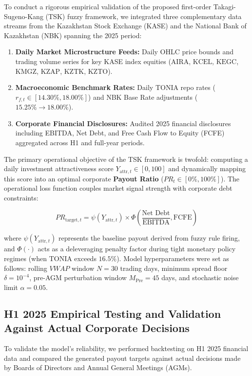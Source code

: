 \documentclass[pdflatex,sn-mathphys-num]{sn-jnl}
\theoremstyle{thmstyleone}
\theoremstyle{thmstyletwo}
\theoremstyle{thmstylethree}
\begin{document}
To conduct a rigorous empirical validation of the proposed first-order Takagi-Sugeno-Kang (TSK) fuzzy framework, we integrated three complementary data streams from the Kazakhstan Stock Exchange (KASE) and the National Bank of Kazakhstan (NBK) spanning the 2025 period:
\begin{enumerate}
    \item \textbf{Daily Market Microstructure Feeds:} Daily OHLC price bounds and trading volume series for key KASE index equities ($\text{AIRA}$, $\text{KCEL}$, $\text{KEGC}$, $\text{KMGZ}$, $\text{KZAP}$, $\text{KZTK}$, $\text{KZTO}$).
    \item \textbf{Macroeconomic Benchmark Rates:} Daily TONIA repo rates ($r_{f,t} \in [14.30\%, 18.00\%]$) and NBK Base Rate adjustments ($15.25\% \to 18.00\%$).
    \item \textbf{Corporate Financial Disclosures:} Audited 2025 financial disclosures including EBITDA, Net Debt, and Free Cash Flow to Equity (FCFE) aggregated across H1 and full-year periods.
\end{enumerate}

The primary operational objective of the TSK framework is twofold: computing a daily investment attractiveness score $Y_{\text{attr},t} \in [0, 100]$ and dynamically mapping this score into an optimal corporate \textbf{Payout Ratio} ($PR_t \in [0\%, 100\%]$). The operational loss function couples market signal strength with corporate debt constraints:

\begin{equation}
PR_{\text{target},t} = \psi(Y_{\text{attr},t}) \times \Phi\left(\frac{\text{Net Debt}}{\text{EBITDA}}, \text{FCFE}\right)
\end{equation}

where $\psi(Y_{\text{attr},t})$ represents the baseline payout derived from fuzzy rule firing, and $\Phi(\cdot)$ acts as a deleveraging penalty factor during tight monetary policy regimes (when TONIA exceeds $16.5\%$). Model hyperparameters were set as follows: rolling $VWAP$ window $N = 30$ trading days, minimum spread floor $\delta = 10^{-4}$, pre-AGM perturbation window $M_{\text{Pre}} = 45$ days, and stochastic noise limit $\alpha = 0.05$.

\subsection{H1 2025 Empirical Testing and Validation Against Actual Corporate Decisions}

To validate the model's reliability, we performed backtesting on H1 2025 financial data and compared the generated payout targets against actual decisions made by Boards of Directors and Annual General Meetings (AGMs).
\end{document}
